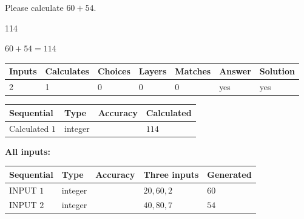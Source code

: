 \documentclass[12pt]{article}
\begin{document}
  
 
Please calculate $ %
60 +  %
54 $.
 
 
 
\noindent{}
 
 

114
 
 
\noindent{}
 
 

 
 
 
\noindent{}
 
 

$ %
60 +  %
54=   %
114$
 
 
\noindent{}
 
 

 
   
   
   
   
\noindent\begin{tabular}{|l|l|l|l|l|l|l|}
 \hline
Inputs & Calculates & Choices & Layers & Matches & Answer & Solution \\ \hline
 2  & 
 1  & 
 0
  & 
 0  & 
 0  & 
  yes & 
  yes 
  \\ \hline
 \end{tabular}
   
   
   
   
\noindent{}
   
   
  
  
\noindent\begin{tabular}{|l|l|l|l|}
\hline
 Sequential & Type & Accuracy & Calculated \\ 
\hline
 
 
  Calculated $  1 $ & integer &  & 
  $ 114 $ 
 \\  \hline  
 \end{tabular}
   
   
   
   
\noindent\vspace{0.1in}\hspace{-0.08in} {\textbf{\Large{All inputs: }}}
   
   
  
  
\noindent\begin{tabular}{|l|l|l|l|l|}
\hline
 Sequential & Type & Accuracy & Three inputs & Generated \\ 
\hline
 
 
  INPUT $  1 $ & integer &  & $
 20
 , 
 60
 , 
 2
 $ & $ 60 $ 
 \\  \hline  
 
 
  INPUT $  2 $ & integer &  & $
 40
 , 
 80
 , 
 7
 $ & $ 54 $ 
 \\  \hline  
 \end{tabular}
   
\end{document}
